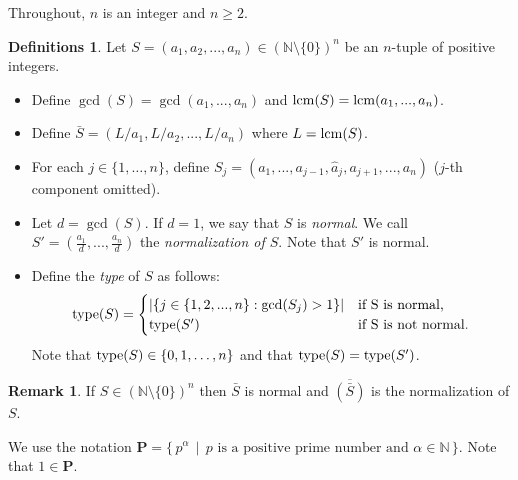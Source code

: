 \documentclass[12pt]{amsart}
\theoremstyle{plain}
\theoremstyle{definition}
\newtheorem{definitions}[subsection]{Definitions}
\newtheorem{remark}[subsection]{Remark}
\newcommand{\lcm}{		\operatorname{{\rm lcm}}}
\newcommand{\type}{		\operatorname{{\rm type}}}
\newcommand{\setspec}[2]{\big\{\,#1\, \mid \,#2\, \big\}}
\newcommand{\Nat}{\ensuremath{\mathbb{N}}}
\begin{document}
	Throughout, $n$ is an integer and $n \ge2$.
	
	\begin{definitions}	\label{typeDef}
		Let $S = (a_1, a_2, ..., a_n) \in (\Nat \setminus\{0\})^n$ be an $n$-tuple of positive integers.
		
		\begin{itemize}
			\item Define $\gcd(S) = \gcd(a_1,...,a_n)$ and $\lcm(S) = \lcm(a_1, ..., a_n)$.
			\item Define $\bar{S} = (L/a_1, L/a_2,..., L/a_n)$ where $L = \lcm(S)$.  %
			\item For each $j \in \{1,\dots,n\}$, define $S_j = (a_1, ..., a_{j-1}, \hat a_j, a_{j+1}, ..., a_n)$ ($j$-th component omitted).
			
			\item Let $d = \gcd(S)$. If $d = 1$, we say that $S$ is \textit{normal}.
			We call $S' = (\frac{a_1}{d}, ... , \frac{a_n}{d})$ the \textit{normalization of $S$}. Note that $S'$ is normal.
			
			
			
			\item Define the \textit{type} of $S$ as follows:
			\begin{equation*}
			\type(S) = 
			\begin{cases}
			|\{j \in \{1,2,...,n\} : \gcd(S_j) > 1\}| & \text{if S is normal,}\\
			\type(S') & \text{if S is not normal.}
			\end{cases}
			\end{equation*}
			Note that $\type(S) \in \{0,1,\dots,n\}$ and that $\type(S) = \type(S')$.
			
		\end{itemize}  
	\end{definitions}
	
	\begin{remark}
		If $S \in (\Nat \setminus \{0\})^n$ then $\bar S$ is normal and $\overline{ (\bar S) }$ is the normalization of $S$.
	\end{remark}
	
	We use the notation $\mathbf{P} = \setspec{p^\alpha}{ \text{$p$ is a positive prime number and $\alpha \in \Nat$} }$.
	Note that $1 \in \mathbf{P}$.
	
\end{document}
